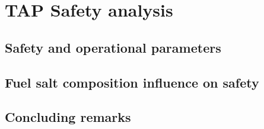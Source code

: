 \chapter[TAP Safety Analysis]{TAP Safety analysis}

\section{Safety and operational parameters}

\section{Fuel salt composition influence on safety}

\section{Concluding remarks}